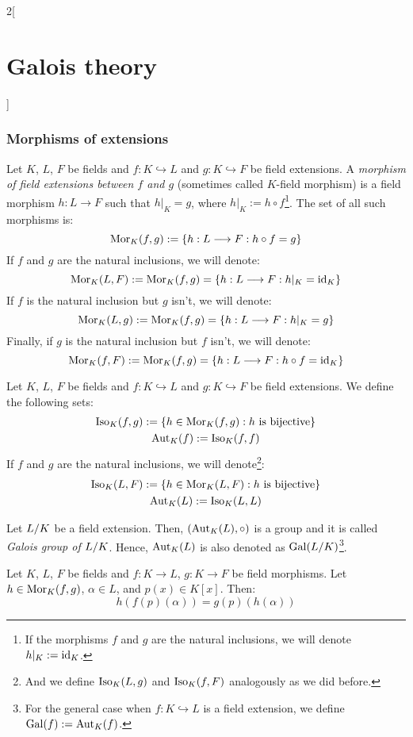 \documentclass[../../../main.tex]{subfiles}
\begin{document}
\begin{multicols}{2}[\section{Galois theory}]
  \subsubsection{Morphisms of extensions}
  \begin{definition}
    Let $K$, $L$, $F$ be fields and $f:K\hookrightarrow L$ and $g:K\hookrightarrow F$ be field extensions. A \textit{morphism of field extensions between $f$ and $g$} (sometimes called $K$-field morphism) is a field morphism $h:L\rightarrow F$ such that $h|_K=g$, where $h|_K:=h\circ f$\footnote{If the morphisms $f$ and $g$ are the natural inclusions, we will denote $h|_K:=\mathrm{id}_K$.}. The set of all such morphisms is:
    $$\operatorname{Mor}_K(f,g):=\{h:L\longrightarrow F:h\circ f=g\}$$
    If $f$ and $g$ are the natural inclusions, we will denote: $$\operatorname{Mor}_K(L,F):=\operatorname{Mor}_K(f,g)=\{h:L\longrightarrow F:h|_K=\mathrm{id}_K\}$$
    If $f$ is the natural inclusion but $g$ isn't, we will denote: $$\operatorname{Mor}_K(L,g):=\operatorname{Mor}_K(f,g)=\{h:L\longrightarrow F:h|_K=g\}$$
    Finally, if $g$ is the natural inclusion but $f$ isn't, we will denote: $$\operatorname{Mor}_K(f,F):=\operatorname{Mor}_K(f,g)=\{h:L\longrightarrow F:h\circ f=\mathrm{id}_K\}$$
  \end{definition}
  \begin{definition}
    Let $K$, $L$, $F$ be fields and $f:K\hookrightarrow L$ and $g:K\hookrightarrow F$ be field extensions. We define the following sets:
    \begin{gather*}
      \operatorname{Iso}_K(f,g):=\{h\in\operatorname{Mor}_K(f,g):h\text{ is bijective}\} \\
      \operatorname{Aut}_K(f):=\operatorname{Iso}_K(f,f)
    \end{gather*}
    If $f$ and $g$ are the natural inclusions, we will denote\footnote{And we define $\operatorname{Iso}_K(L,g)$ and $\operatorname{Iso}_K(f,F)$ analogously as we did before.}:
    \begin{gather*}
      \operatorname{Iso}_K(L,F):=\{h\in\operatorname{Mor}_K(L,F):h\text{ is bijective}\} \\
      \operatorname{Aut}_K(L):=\operatorname{Iso}_K(L,L)
    \end{gather*}
  \end{definition}
  \begin{lemma}
    Let $\quot{L}{K}$ be a field extension. Then, $(\operatorname{Aut}_K(L),\circ)$ is a group and it is called \textit{Galois group of $\quot{L}{K}$}. Hence, $\operatorname{Aut}_K(L)$ is also denoted as $\Gal(\quot{L}{K})$\footnote{For the general case when $f:K\hookrightarrow L$ is a field extension, we define $\operatorname{Gal}(f):=\operatorname{Aut}_K(f)$.}.
  \end{lemma}
  \begin{lemma}
    Let $K$, $L$, $F$ be fields and $f:K\rightarrow L$, $g:K \rightarrow F$ be field morphisms. Let $h\in\operatorname{Mor}_K(f,g)$, $\alpha\in L$, and $p(x)\in K[x]$. Then: $$h(f(p)(\alpha))=g(p)(h(\alpha))$$

\end{lemma}
\end{multicols}
\end{document}
